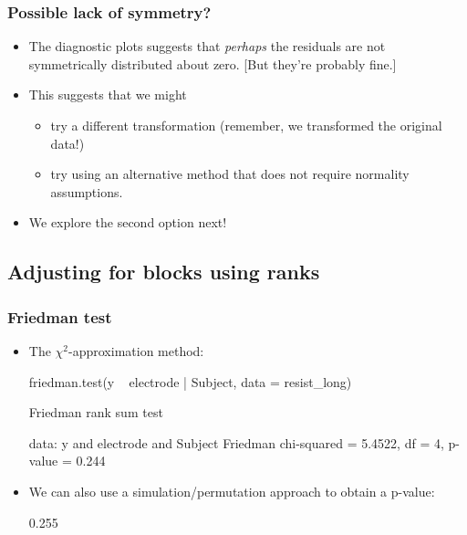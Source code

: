 \documentclass[a4paper]{article}\usepackage[]{graphicx}\usepackage[]{xcolor}
\begin{document}
\subsubsection{Possible lack of symmetry?}
\begin{itemize}
	\item The diagnostic plots suggests that \textit{perhaps} the residuals are not symmetrically distributed about zero. [But they're probably fine.]
	\item This suggests that we might
	\begin{itemize}
		\item try a different transformation (remember, we transformed the original data!)
		\item try using an alternative method that does not require normality assumptions.
	\end{itemize}
	\item We explore the second option next!
\end{itemize}
\subsection{Adjusting for blocks using ranks}
\subsubsection{Friedman test}
\begin{itemize}
	\item The \( \chi^2 \)-approximation method:
\begin{Schunk}
\begin{Sinput}
friedman.test(y ~ electrode | Subject, data = resist_long)
\end{Sinput}
\begin{Soutput}

	Friedman rank sum test

data:  y and electrode and Subject
Friedman chi-squared = 5.4522, df = 4, p-value = 0.244
\end{Soutput}
\end{Schunk}
\item We can also use a simulation/permutation approach to obtain a p-value:
\begin{Schunk}
\begin{Soutput}
[1] 0.255
\end{Soutput}
\end{Schunk}
\end{itemize}
\end{document}
